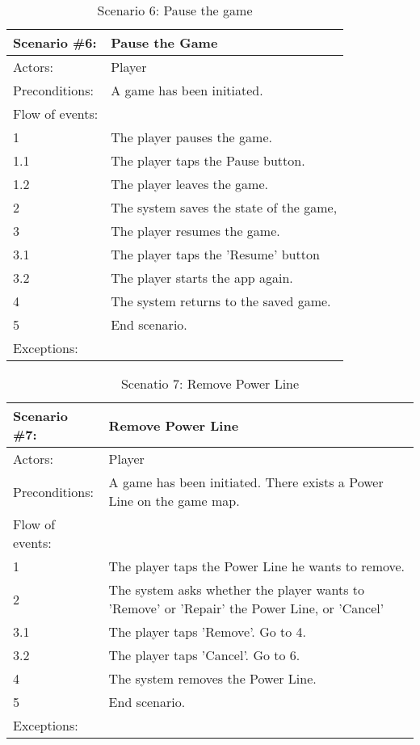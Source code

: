 \begin{table}
	\begin{tabular}{| l | p{10cm} |}
		\hline
		\rowcolor{lightgray}
		{\bf Scenario \#6:} & {\bf Pause the Game} \\ \hline
		Actors: & Player \\ \hline
		Preconditions: & A game has been initiated. \\ \hline
		\rowcolor{lightergray}
		Flow of events: & \\ \hline
		1 & The player pauses the game. \\ \hline
		1.1 & The player taps the Pause button. \\ \hline
		1.2 & The player leaves the game. \\ \hline
		2 & The system saves the state of the game, \\ \hline
		3 & The player resumes the game. \\ \hline
		3.1 & The player taps the 'Resume' button \\ \hline
		3.2 & The player starts the app again. \\ \hline
		4 & The system returns to the saved game. \\ \hline
		5 & End scenario. \\ \hline
		\rowcolor{lightergray}
		Exceptions: & \\ \hline
	\end{tabular}
	\caption{Scenario 6: Pause the game}
\end{table}

\begin{table}
	\begin{tabular}{| l | p{10cm} |}
		\hline
		\rowcolor{lightgray}
		{\bf Scenario \#7:} & {\bf Remove Power Line} \\ \hline
		Actors: & Player \\ \hline
		Preconditions: & A game has been initiated. There exists a Power Line on the game map. \\ \hline
		\rowcolor{lightergray}		
		Flow of events: & \\ \hline
		1 & The player taps the Power Line he wants to remove. \\ \hline
		2 & The system asks whether the player wants to 'Remove' or 'Repair' the Power Line, or 'Cancel' \\ \hline
		3.1 & The player taps 'Remove'. Go to 4. \\ \hline
		3.2 & The player taps 'Cancel'. Go to 6. \\ \hline
		4 & The system removes the Power Line. \\ \hline
		5 & End scenario. \\ \hline
		\rowcolor{lightergray}
		Exceptions: & \\ \hline
	\end{tabular}
	\caption{Scenatio 7: Remove Power Line}
\end{table}


